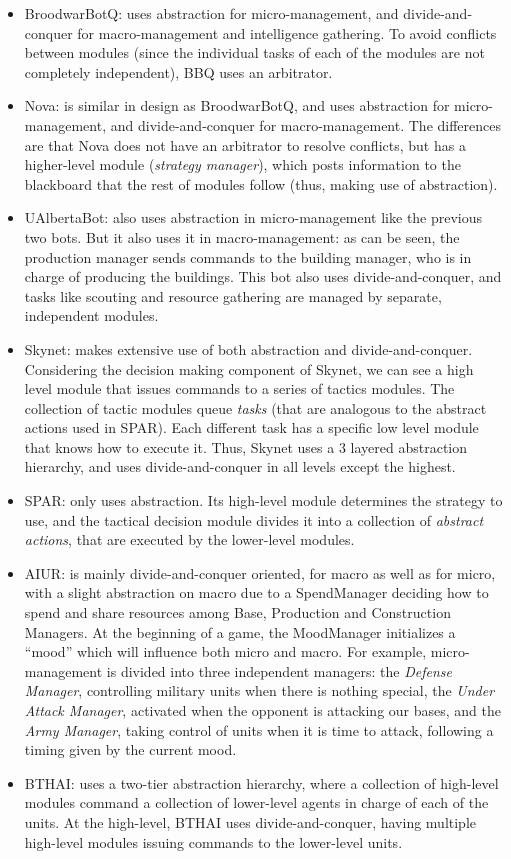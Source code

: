 \documentclass[journal]{IEEEtran}
\begin{document}
\begin{itemize}
\item BroodwarBotQ: uses abstraction for micro-management, and divide-and-conquer for macro-management and intelligence gathering. To avoid conflicts between modules (since the individual tasks of each of the modules are not completely independent), BBQ uses an arbitrator.
\item Nova: is similar in design as BroodwarBotQ, and uses abstraction for micro-management, and divide-and-conquer for macro-management. The differences are that Nova does not have an arbitrator to resolve conflicts, but has a higher-level module ({\em strategy manager}), which posts information to the blackboard that the rest of modules follow (thus, making use of abstraction).
\item UAlbertaBot: also uses abstraction in micro-management like the previous two bots. But it also uses it in macro-management: as can be seen, the production manager sends commands to the building manager, who is in charge of producing the buildings. This bot also uses divide-and-conquer, and tasks like scouting and resource gathering are managed by separate, independent modules.
\item Skynet: makes extensive use of both abstraction and divide-and-conquer. Considering the decision making component of Skynet, we can see a high level module that issues commands to a series of tactics modules. The collection of tactic modules queue {\em tasks} (that are analogous to the abstract actions used in SPAR). Each different task has a specific low level module that knows how to execute it. Thus, Skynet uses a 3 layered abstraction hierarchy, and uses divide-and-conquer in all levels except the highest.
\item SPAR: only uses abstraction. Its high-level module determines the strategy to use, and the tactical decision module divides it into a collection of {\em abstract actions}, that are executed by the lower-level modules.
\item AIUR:  is mainly divide-and-conquer oriented, for  macro as well
  as  for  micro,  with  a  slight  abstraction  on  macro  due  to  a
  SpendManager deciding how to spend and share resources among Base, Production and Construction Managers. At the beginning of a game, the MoodManager initializes a ``mood'' which will influence both micro and macro. For example, micro-management is divided into three independent managers: the {\em Defense Manager}, controlling military units when there is nothing special, the {\em Under Attack Manager}, activated when the opponent is attacking our bases, and the {\em Army Manager}, taking control of units when it is time to attack, following a timing given by the current mood.
\item BTHAI: uses a two-tier abstraction hierarchy, where a collection of high-level modules command a collection of lower-level agents in charge of each of the units. At the high-level, BTHAI uses divide-and-conquer, having multiple high-level modules issuing commands to the lower-level units.
\end{itemize}
\end{document}
